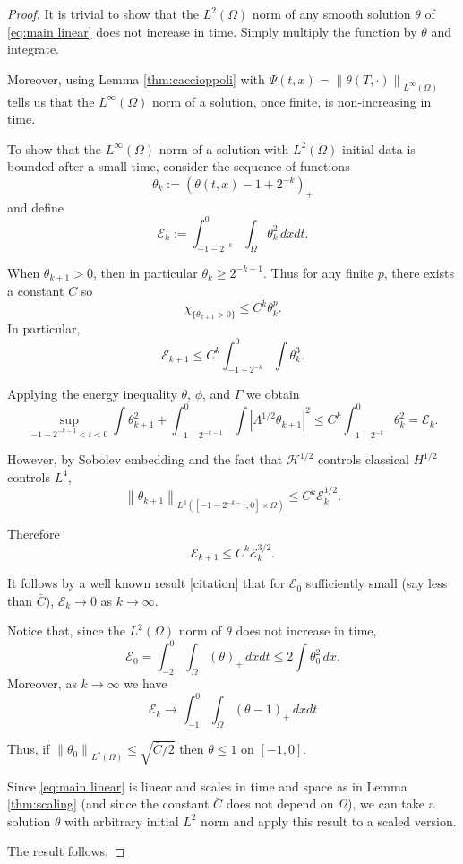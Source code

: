 \documentclass[11pt]{amsart}
\theoremstyle{remark}
\theoremstyle{definition}
\newcommand{\E}{\mathcal{E}}
\newcommand{\norm}[1]{\left\lVert#1\right\rVert}
\newcommand{\abs}[1]{\left\lvert #1 \right\rvert}
\newcommand{\indic}[1]{\chi_{\{#1\}}}
\newcommand{\HD}{\mathcal{H}}
\begin{document}
\begin{proof}
It is trivial to show that the $L^2(\Omega)$ norm of any smooth solution $\theta$ of \eqref{eq:main linear} does not increase in time.  Simply multiply the function by $\theta$ and integrate.  

Moreover, using Lemma \ref{thm:caccioppoli} with $\Psi(t,x) = \norm{\theta(T,\cdot)}_{L^\infty(\Omega)}$ tells us that the $L^\infty(\Omega)$ norm of a solution, once finite, is non-increasing in time.

To show that the $L^\infty(\Omega)$ norm of a solution with $L^2(\Omega)$ initial data is bounded after a small time, consider the sequence of functions
\[ \theta_k := (\theta(t,x) - 1 + 2^{-k})_+ \]
and define
\[ \E_k := \int_{-1-2^{-k}}^0 \int_\Omega \theta_k^2 \,dxdt. \]

When $\theta_{k+1}>0$, then in particular $\theta_k \geq 2^{-k-1}$.  Thus for any finite $p$, there exists a constant $C$ so
\[ \indic{\theta_{k+1}>0} \leq C^k \theta_k^p. \]
In particular,
\[ \E_{k+1} \leq C^k \int_{-1-2^{-k}}^0 \int \theta_k^3. \]

Applying the energy inequality $\theta$, $\phi$, and $\Gamma$ we obtain
\[ \sup_{-1-2^{-k-1}<t<0} \int \theta_{k+1}^2 + \int_{-1-2^{-k-1}}^0 \int \abs{\Lambda^{1/2}\theta_{k+1}}^2 \leq C^k \int_{-1-2^{-k}}^0 \theta_k^2 = \E_k. \]

However, by Sobolev embedding and the fact that $\HD^{1/2}$ controls classical $H^{1/2}$ controls $L^4$,
\[ \norm{\theta_{k+1}}_{L^3([-1-2^{-k-1},0]\times\Omega)} \leq C^k \E_k^{1/2}. \]

Therefore
\[ \E_{k+1} \leq C^k \E_k^{3/2}. \]

It follows by a well known result [citation] that for $\E_0$ sufficiently small (say less than $\bar{C}$), $\E_k \to 0$ as $k \to \infty$.  

Notice that, since the $L^2(\Omega)$ norm of $\theta$ does not increase in time,
\[ \E_0 = \int_{-2}^0 \int_\Omega (\theta)_+ \,dxdt \leq 2 \int \theta_0^2 \,dx . \]
Moreover, as $k \to \infty$ we have
\[ \E_k \to \int_{-1}^0 \int_\Omega (\theta - 1)_+ \,dxdt \]

Thus, if $\norm{\theta_0}_{L^2(\Omega)} \leq \sqrt{\bar{C}/2}$ then $\theta \leq 1$ on $[-1,0]$.  

Since \eqref{eq:main linear} is linear and scales in time and space as in Lemma \ref{thm:scaling} (and since the constant $\bar{C}$ does not depend on $\Omega$), we can take a solution $\theta$ with arbitrary initial $L^2$ norm and apply this result to a scaled version. 

The result follows.  
\end{proof}
\end{document}
